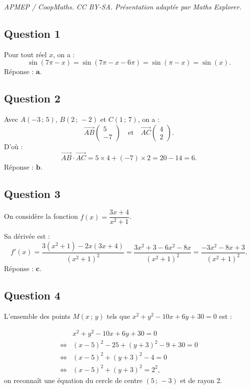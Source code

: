 \documentclass[10pt]{article}
\begin{document}
\noindent\textit{APMEP / CoopMaths. CC BY-SA. Présentation adaptée par Maths Explorer.}\par\medskip
\subsection*{Question 1}

Pour tout réel \(x\), on a :
\[
\sin(7\pi - x) = \sin(7\pi - x - 6\pi) = \sin(\pi - x) = \sin(x).
\]
Réponse : \(\textbf{a.}\)

\subsection*{Question 2}

Avec \( A(-3\,;\,5) \), \( B(2\,;\,-2) \) et \( C(1\,;\,7) \), on a :
\[
\overrightarrow{AB} \begin{pmatrix} 5 \\ -7 \end{pmatrix} \quad \text{et} \quad \overrightarrow{AC} \begin{pmatrix} 4 \\ 2 \end{pmatrix}.
\]
D'où :
\[
\overrightarrow{AB} \cdot \overrightarrow{AC} = 5 \times 4 + (-7) \times 2 = 20 - 14 = 6.
\]
Réponse : \(\textbf{b.}\)

\subsection*{Question 3}

On considère la fonction \(f(x) = \dfrac{3x + 4}{x^2 + 1}\).

Sa dérivée est :
\[
f'(x) = \dfrac{3(x^2 + 1) - 2x(3x + 4)}{(x^2 + 1)^2} = \dfrac{3x^2 + 3 - 6x^2 - 8x}{(x^2 + 1)^2} = \dfrac{-3x^2 - 8x + 3}{(x^2 + 1)^2}.
\]
Réponse : \(\textbf{c.}\)

\subsection*{Question 4}

L'ensemble des points \( M(x\,;\,y) \) tels que \( x^2 + y^2 - 10x + 6y + 30 = 0 \) est :

\begin{align*}
&x^2 + y^2 - 10x + 6y + 30 = 0 \\
\iff &(x - 5)^2 - 25 + (y + 3)^2 - 9 + 30 = 0 \\
\iff &(x - 5)^2 + (y + 3)^2 - 4 = 0 \\
\iff &(x - 5)^2 + (y + 3)^2 = 2^2,
\end{align*}
on reconnaît une équation du cercle de centre \( (5\,;\,-3) \) et de rayon 2.
\end{document}
